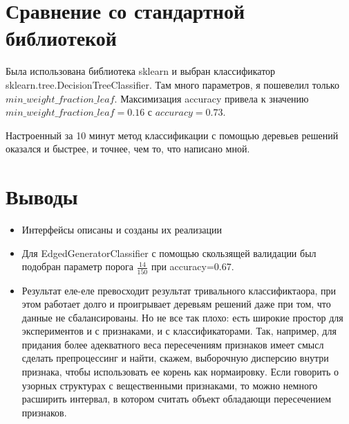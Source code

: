 \documentclass{article}
\begin{document}
\section{Сравнение со стандартной библиотекой}
    Была использована библиотека sklearn и выбран классификатор sklearn.tree.DecisionTreeClassifier. Там много параметров, я пошевелил только $ min\_weight\_fraction\_leaf $. Максимизация accuracy привела к значению $ min\_weight\_fraction\_leaf=0.16 $ с $ accuracy=0.73 $.

    Настроенный за 10 минут метод классификации с помощью деревьев решений оказался и быстрее, и точнее, чем то, что написано мной.
\section{Выводы}
    \begin{itemize}
        \item Интерфейсы описаны и созданы их реализации
        \item Для EdgedGeneratorClassifier с помощью скользящей валидации был подобран параметр порога $ \frac{14}{150} $ при accuracy=0.67.
        \item Результат еле-еле превосходит результат тривального классификтаора, при этом работает долго и проигрывает деревьям решений даже при том, что данные не сбалансированы. Но не все так плохо: есть широкие простор для экспериментов и с признаками, и с классификаторами. Так, например, для придания более адекватного веса пересечениям признаков имеет смысл сделать препроцессинг и найти, скажем, выборочную дисперсию внутри признака, чтобы использовать ее корень как нормаировку. Если говорить о узорных структурах с вещественными признаками, то можно немного расширить интервал, в котором считать объект обладающи пересечением признаков.
    \end{itemize}
\end{document}
